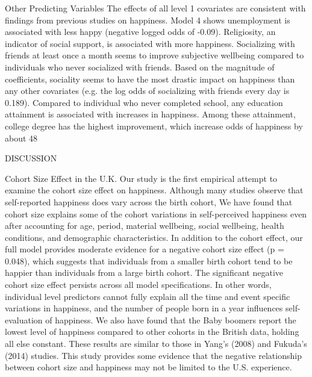 Other Predicting Variables
	The effects of all level 1 covariates are consistent with findings from previous studies on happiness. Model 4 shows unemployment is associated with less happy (negative logged odds of -0.09). Religiosity, an indicator of social support, is associated with more happiness. Socializing with friends at least once a month seems to improve subjective wellbeing compared to individuals who never socialized with friends. Based on the magnitude of coefficients, sociality seems to have the most drastic impact on happiness than any other covariates (e.g. the log odds of socializing with friends every day is 0.189). Compared to individual who never completed school, any education attainment is associated with increases in happiness. Among these attainment, college degree has the highest improvement, which increase odds of happiness by about 48%


DISCUSSION

Cohort Size Effect in the U.K.
Our study is the first empirical attempt to examine the cohort size effect on happiness. Although many studies observe that self-reported happiness does vary across the birth cohort, We have found that cohort size explains some of the cohort variations in self-perceived happiness even after accounting for age, period, material wellbeing, social wellbeing, health conditions, and demographic characteristics. In addition to the cohort effect, our full model provides moderate evidence for a negative cohort size effect (p = 0.048), which suggests that individuals from a smaller birth cohort tend to be happier than individuals from a large birth cohort. The significant negative cohort size effect persists across all model specifications. In other words, individual level predictors cannot fully explain all the time and event specific variations in happiness, and the number of people born in a year influences self-evaluation of happiness. We also have found that the Baby boomers report the lowest level of happiness compared to other cohorts in the British data, holding all else constant. These results are similar to those in Yang's (2008) and Fukuda’s (2014) studies. This study provides some evidence that the negative relationship between cohort size and happiness may not be limited to the U.S. experience. 


